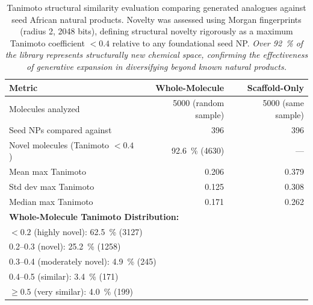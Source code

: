 \documentclass[journal=jcisd8,manuscript=suppinfo]{achemso}
\begin{document}
\begin{table}[htbp]
\centering
\caption{Tanimoto structural similarity evaluation comparing generated analogues against seed African natural products. Novelty was assessed using Morgan fingerprints (radius \num{2}, \num{2048} bits), defining structural novelty rigorously as a maximum Tanimoto coefficient $< \num{0.4}$ relative to any foundational seed NP. \textit{Over \qty{92}{\percent} of the library represents structurally new chemical space, confirming the effectiveness of generative expansion in diversifying beyond known natural products.}}
\label{tab:tanimoto_novelty}
\begin{tabular}{@{}l r r@{}}
\toprule
\textbf{Metric} & \textbf{Whole-Molecule} & \textbf{Scaffold-Only} \\
\midrule
Molecules analyzed & \num{5000} (random sample) & \num{5000} (same sample) \\
Seed NPs compared against & \num{396} & \num{396} \\
Novel molecules (Tanimoto $< \num{0.4}$) & \qty{92.6}{\percent} (\num{4630}) & --- \\
Mean max Tanimoto & \num{0.206} & \num{0.379} \\
Std dev max Tanimoto & \num{0.125} & \num{0.308} \\
Median max Tanimoto & \num{0.171} & \num{0.262} \\
\midrule
\multicolumn{3}{l}{\textbf{Whole-Molecule Tanimoto Distribution:}} \\
\multicolumn{3}{l}{\quad $< \num{0.2}$ (highly novel): \qty{62.5}{\percent} (\num{3127})} \\
\multicolumn{3}{l}{\quad \numrange{0.2}{0.3} (novel): \qty{25.2}{\percent} (\num{1258})} \\
\multicolumn{3}{l}{\quad \numrange{0.3}{0.4} (moderately novel): \qty{4.9}{\percent} (\num{245})} \\
\multicolumn{3}{l}{\quad \numrange{0.4}{0.5} (similar): \qty{3.4}{\percent} (\num{171})} \\
\multicolumn{3}{l}{\quad $\geq \num{0.5}$ (very similar): \qty{4.0}{\percent} (\num{199})} \\
\bottomrule
\end{tabular}
\end{table}
\end{document}

